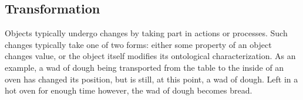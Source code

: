 



\subsection{Transformation}
\label{sec:transformation}

Objects typically undergo changes by taking part in actions or processes. Such changes typically take one of two forms: either some property of an object changes value, or the object itself modifies its ontological characterization. As an example, a wad of dough being transported from the table to the inside of an oven has changed its position, but is still, at this point, a wad of dough. Left in a hot oven for enough time however, the wad of dough becomes bread.

